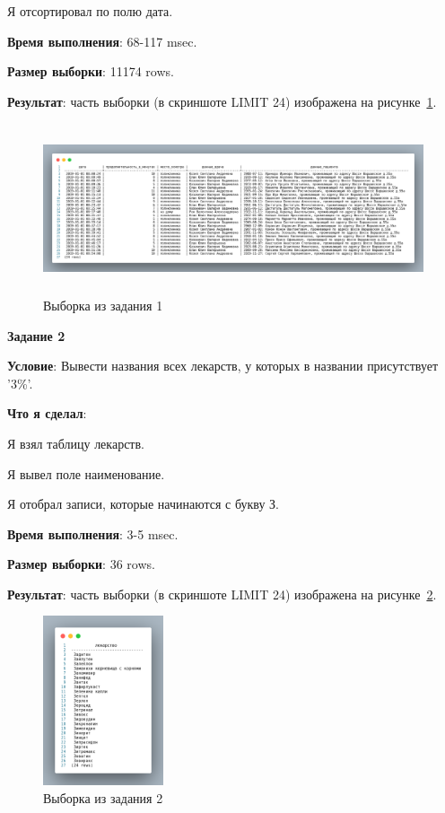 Я отсортировал по полю дата.



\textbf{Время выполнения}: 68-117 msec.

\textbf{Размер выборки}: 11174 rows.

\textbf{Результат}: часть выборки (в скриншоте LIMIT 24) изображена на рисунке~\ref{fig:t1}.

\begin{figure}[!h]
  \centering

  \includegraphics[height=5cm]
  {../sql/task1/1-out.png}

  \caption{Выборка из задания 1}

  \label{fig:t1}
\end{figure}


\begin{center}
  \textbf{Задание 2}
\end{center}
  
\textbf{Условие}:
Вывести названия всех лекарств, у которых в названии присутствует '3\%'.
  
\textbf{Что я сделал}:

Я взял таблицу лекарств.

Я вывел поле наименование.

Я отобрал записи, которые начинаются с букву З.



\textbf{Время выполнения}: 3-5 msec.

\textbf{Размер выборки}: 36 rows.

\textbf{Результат}: часть выборки (в скриншоте LIMIT 24) изображена на рисунке~\ref{fig:t2}.

\begin{figure}[!h]
  \centering

  \includegraphics[height=5cm]
  {../sql/task2/2-out.png}

  \caption{Выборка из задания 2}

  \label{fig:t2}
\end{figure}

